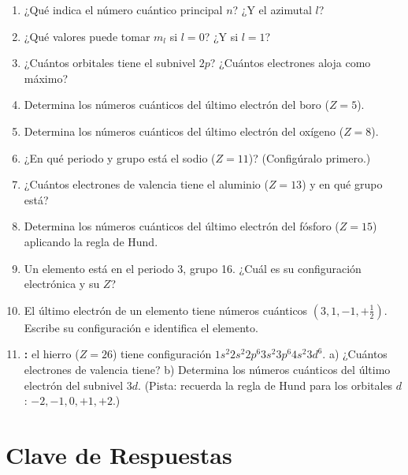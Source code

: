 \documentclass[12pt, letterpaper]{article}
\begin{document}
\begin{enumerate}[leftmargin=*, resume]
  \item \facil{} ¿Qué indica el número cuántico principal $n$? ¿Y el azimutal $l$?

  \item \facil{} ¿Qué valores puede tomar $m_l$ si $l = 0$? ¿Y si $l = 1$?

  \item \facil{} ¿Cuántos orbitales tiene el subnivel $2p$? ¿Cuántos electrones aloja como máximo?

  \item \medio{} Determina los números cuánticos del último electrón del boro ($Z = 5$).

  \item \medio{} Determina los números cuánticos del último electrón del oxígeno ($Z = 8$).

  \item \medio{} ¿En qué periodo y grupo está el sodio ($Z = 11$)? (Configúralo primero.)

  \item \medio{} ¿Cuántos electrones de valencia tiene el aluminio ($Z = 13$) y en qué grupo está?

  \item \dificil{} Determina los números cuánticos del último electrón del fósforo ($Z = 15$) aplicando la regla de Hund.

  \item \dificil{} Un elemento está en el periodo 3, grupo 16. ¿Cuál es su configuración electrónica y su $Z$?

  \item \dificil{} El último electrón de un elemento tiene números cuánticos $(3, 1, -1, +\tfrac{1}{2})$. Escribe su configuración e identifica el elemento.

  \item \dificil{} \textbf{:} el hierro ($Z = 26$) tiene configuración $1s^{2}2s^{2}2p^{6}3s^{2}3p^{6}4s^{2}3d^{6}$. a) ¿Cuántos electrones de valencia tiene? b) Determina los números cuánticos del último electrón del subnivel $3d$. (Pista: recuerda la regla de Hund para los orbitales $d$: $-2, -1, 0, +1, +2$.)
\end{enumerate}

\newpage

\ifmwclaves
  \section{Clave de Respuestas}
\end{document}
